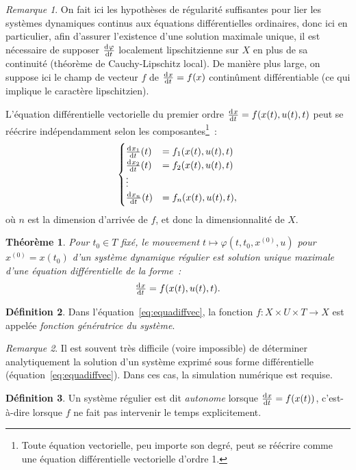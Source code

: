 \documentclass{article}
\newtheorem{thm}{Théorème}[section]
\theoremstyle{definition}
\newtheorem{déf}[thm]{Définition}
\theoremstyle{remark}
\newtheorem*{rmq}{Remarque}
\begin{document}
	\begin{rmq} On fait ici les hypothèses de régularité suffisantes pour lier les systèmes dynamiques continus aux équations différentielles ordinaires, donc
	ici en particulier, afin d'assurer l'existence d'une solution maximale unique, il est nécessaire de supposer $\od \varphi t$ localement lipschitzienne sur $X$
	en plus de sa continuité (théorème de Cauchy-Lipschitz local). De manière plus large, on suppose ici le champ de vecteur $f$ de $\od xt = f(x)$ continûment
	différentiable (ce qui implique le caractère lipschitzien).
	\end{rmq}

	L'équation différentielle vectorielle du premier ordre $\od xt = f(x(t), u(t), t)$ peut se réécrire indépendamment selon les composantes\footnote{Toute
	équation vectorielle, peu importe son degré, peut se réécrire comme une équation différentielle vectorielle d'ordre 1.}~:
	\[\begin{cases}
		\od {x_1}t(t) &= f_1(x(t), u(t), t) \\
		\od {x_2}t(t) &= f_2(x(t), u(t), t) \\
		\vdots \\
		\od {x_n}t(t) &= f_n(x(t), u(t), t),
	\end{cases}\]
	où $n$ est la dimension d'arrivée de $f$, et donc la dimensionnalité de $X$.

	\begin{thm} Pour $t_0 \in T$ fixé, le mouvement $t \mapsto \varphi(t, t_0, x^{(0)}, u)$ pour $x^{(0)} = x(t_0)$ d'un système dynamique régulier est solution
	unique maximale d'une équation différentielle de la forme~:
	\begin{align}\label{eq:equadiffvec}
		\od xt = f(x(t), u(t), t).
	\end{align}
	\end{thm}

	\begin{déf} Dans l'équation~\eqref{eq:equadiffvec}, la fonction $f : X \times U \times T \to X$ est appelée \textit{fonction génératrice du système}.
	\end{déf}

	\begin{rmq} Il est souvent très difficile (voire impossible) de déterminer analytiquement la solution d'un système exprimé sous forme différentielle
	(équation~\eqref{eq:equadiffvec}). Dans ces cas, la simulation numérique est requise.
	\end{rmq}

	\begin{déf} Un système régulier est dit \textit{autonome} lorsque $\od xt = f(x(t))$, c'est-à-dire lorsque $f$ ne fait pas intervenir le temps explicitement.
	\end{déf}
\end{document}
